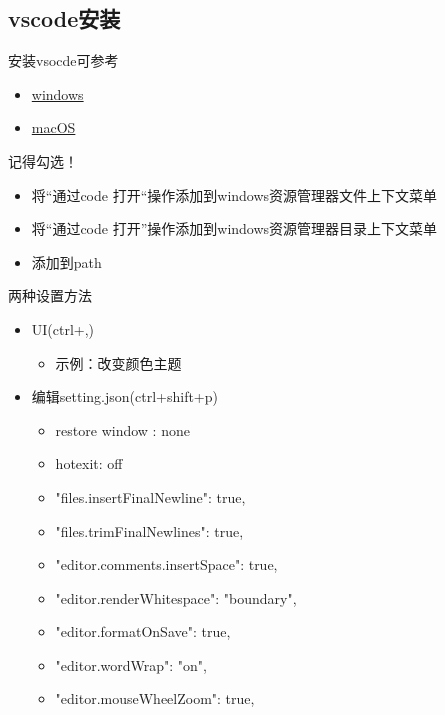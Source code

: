 \documentclass{beamer}
\begin{document}
\subsection{vscode安装}
\begin{frame}
    安装vsocde可参考
    \begin{itemize}
        \item \href{https://zhuanlan.zhihu.com/p/264785441}{windows}
        \item \href{https://blog.csdn.net/weixin_44176432/article/details/109381781}{macOS}
    \end{itemize}
    {\color{red}记得勾选！}
    \begin{itemize}
        \item 将“通过code 打开“操作添加到windows资源管理器文件上下文菜单
        \item 将“通过code 打开”操作添加到windows资源管理器目录上下文菜单
        \item 添加到path
    \end{itemize}

\end{frame}

\begin{frame}{两种设置方法}
    \begin{itemize}
        \item UI(ctrl+,)
              \begin{itemize}
                  \item 示例：改变颜色主题
              \end{itemize}
        \item 编辑setting.json(ctrl+shift+p)
              \begin{itemize}
                  \item restore window : none
                  \item hotexit: off
                  \item "files.insertFinalNewline": true,
                  \item "files.trimFinalNewlines": true,
                  \item "editor.comments.insertSpace": true,
                  \item "editor.renderWhitespace": "boundary",
                  \item "editor.formatOnSave": true,
                  \item "editor.wordWrap": "on",
                  \item "editor.mouseWheelZoom": true,
              \end{itemize}
    \end{itemize}
\end{frame}
\end{document}
